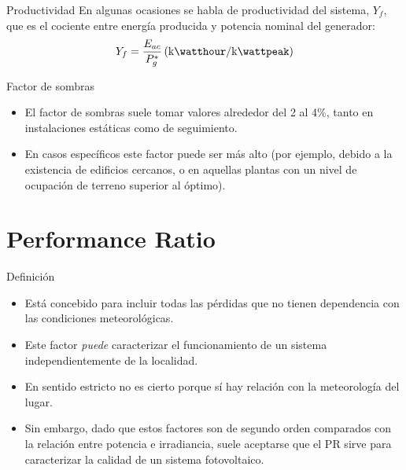 \documentclass[aspectratio=169, usenames,svgnames,dvipsnames]{beamer}
\begin{document}
\begin{frame}[label={sec:org3fc65d5}]{Productividad}
En algunas ocasiones se habla de \alert{productividad} del sistema, \(Y_{f}\),
que es el cociente entre energía producida y potencia nominal del
\alert{generador}:
$$Y_{f}=\frac{E_{ac}}{P_{g}^{*}}\,(\si{\kilo\watthour\per\kilo\wattpeak})$$
\end{frame}

\begin{frame}[label={sec:orgb202828}]{Factor de sombras}
\begin{itemize}
\item \alert{El factor de sombras suele tomar valores alrededor del 2 al 4\%},
tanto en instalaciones estáticas como de seguimiento.

\item En casos específicos este factor puede ser más alto (por ejemplo,
debido a la existencia de edificios cercanos, o en aquellas plantas
con un nivel de ocupación de terreno superior al óptimo).
\end{itemize}
\end{frame}

\section{Performance Ratio}
\label{sec:org86892e3}

\begin{frame}[label={sec:org143bdc4}]{Definición}
\begin{itemize}
\item Está concebido para incluir todas las \alert{pérdidas que no tienen
dependencia con las condiciones meteorológicas}.

\item Este factor \emph{puede} caracterizar el funcionamiento de un sistema
\alert{independientemente de la localidad}.

\item En sentido estricto no es cierto porque sí hay relación con la
meteorología del lugar.

\item Sin embargo, dado que estos factores son de segundo orden comparados
con la relación entre potencia e irradiancia, \alert{suele aceptarse} que el
\alert{PR} sirve para caracterizar la \alert{calidad de un sistema fotovoltaico}.
\end{itemize}
\end{frame}
\end{document}
